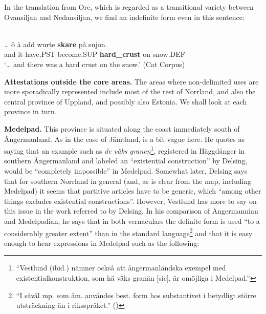 \z

In the translation from Ore, which is regarded as a transitional variety between Ovansiljan and Nedansiljan, we find an indefinite form even in this sentence:


\ea \label{} 
\\
\gll …  ô  ä  add  wurte  \textbf{skare} på  snjon.\\
  and  it  have.PST  become.SUP  \textbf{hard\_crust} on  snow.DEF\\
\glt ‘… and there was a hard crust on the snow.’ (Cat Corpus)

\z

\textbf{Attestations outside the core areas.} The areas where non-delimited uses are more sporadically represented include most of the rest of Norrland, and also the central province of Uppland, and possibly also Estonia. We shall look at each province in turn.


\textbf{Medelpad.} This province is situated along the coast immediately south of Ångermanland. As in the case of Jämtland, \citet[19]{Delsing2003a} is a bit vague here. He quotes \citet[21]{Vestlund1923} as saying that an example such as \textit{de väks granen}\footnote{ “Vestlund (ibid.) nämner också att ångermanländska exempel med existentialkonstruktion, som hä väks granän [sic], är omöjliga i Medelpad.”}, registered in Häggdånger in southern Ångermanland and labeled an “existential construction” by Delsing, would be “completely impossible” in Medelpad. Somewhat later, Delsing says that for southern Norrland in general (and, as is clear from the map, including Medelpad) it seems that partitive articles have to be generic, which “among other things excludes existential constructions”. However, Vestlund has more to say on this issue in the work referred to by Delsing. In his comparison of Angermannian and Medelpadian, he says that in both vernaculars the definite form is used “to a considerably greater extent” than in the standard language\footnote{ “I såväl mp. som åm. användes best. form hos substantivet i betydligt större utsträckning än i riksspråket.” (\citet[20]{Vestlund1923})} and that it is easy enough to hear expressions in Medelpad such as the following:

